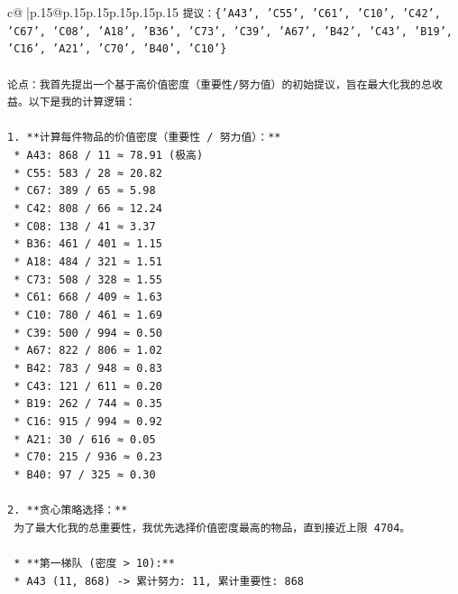 \documentclass{article}
\begin{document}
{\begin{supertabular}{c@{$\;$}|p{.15\linewidth}@{}p{.15\linewidth}p{.15\linewidth}p{.15\linewidth}p{.15\linewidth}p{.15\linewidth}}
{{{\texttt{提议：\{'A43', 'C55', 'C61', 'C10', 'C42', 'C67', 'C08', 'A18', 'B36', 'C73', 'C39', 'A67', 'B42', 'C43', 'B19', 'C16', 'A21', 'C70', 'B40', 'C10'\}} \\
\\ 
\texttt{论点：我首先提出一个基于高价值密度（重要性/努力值）的初始提议，旨在最大化我的总收益。以下是我的计算逻辑：} \\
\\ 
\texttt{1.  **计算每件物品的价值密度（重要性 / 努力值）：**} \\
\texttt{    *   A43: 868 / 11 ≈ 78.91 (极高)} \\
\texttt{    *   C55: 583 / 28 ≈ 20.82} \\
\texttt{    *   C67: 389 / 65 ≈ 5.98} \\
\texttt{    *   C42: 808 / 66 ≈ 12.24} \\
\texttt{    *   C08: 138 / 41 ≈ 3.37} \\
\texttt{    *   B36: 461 / 401 ≈ 1.15} \\
\texttt{    *   A18: 484 / 321 ≈ 1.51} \\
\texttt{    *   C73: 508 / 328 ≈ 1.55} \\
\texttt{    *   C61: 668 / 409 ≈ 1.63} \\
\texttt{    *   C10: 780 / 461 ≈ 1.69} \\
\texttt{    *   C39: 500 / 994 ≈ 0.50} \\
\texttt{    *   A67: 822 / 806 ≈ 1.02} \\
\texttt{    *   B42: 783 / 948 ≈ 0.83} \\
\texttt{    *   C43: 121 / 611 ≈ 0.20} \\
\texttt{    *   B19: 262 / 744 ≈ 0.35} \\
\texttt{    *   C16: 915 / 994 ≈ 0.92} \\
\texttt{    *   A21: 30 / 616 ≈ 0.05} \\
\texttt{    *   C70: 215 / 936 ≈ 0.23} \\
\texttt{    *   B40: 97 / 325 ≈ 0.30} \\
\\ 
\texttt{2.  **贪心策略选择：**} \\
\texttt{    为了最大化我的总重要性，我优先选择价值密度最高的物品，直到接近上限 4704。} \\
\\ 
\texttt{    *   **第一梯队 (密度 > 10):**} \\
\texttt{        *   A43 (11, 868) {-}> 累计努力: 11, 累计重要性: 868} \\
}}}
\end{supertabular}}
\end{document}
